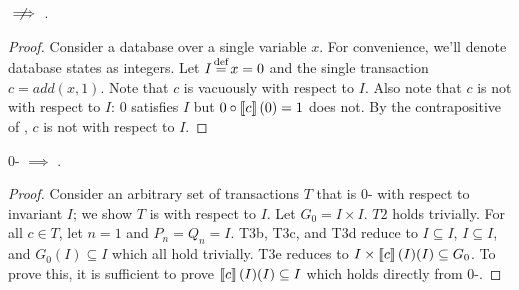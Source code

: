 \begin{claim}\label{clm:iconfluence-not-implies-istrengthstar}
  \iconfluence{} $\centernot\implies$ \istrengthstar{}.
\end{claim}
\begin{proof}
  Consider a database over a single variable $x$. For convenience, we'll denote
  database states as integers. Let $I \defeq x = 0$ and the single \imp{}
  transaction $c = add(x, 1)$. Note that $c$ is vacuously \iconfluent{} with
  respect to $I$. Also note that $c$ is not \ipreserving{} with respect to $I$:
  $0$ satisfies $I$ but $0 \circ \left\llbracket c\right\rrbracket(0) = 1$ does not. By the
  contrapositive of , $c$ is not
  \istrongstar{} with respect to $I$.
\end{proof}

\begin{claim}\label{clm:0-isafety-implies-istrength}
  0-\isafety{} $\implies$ \istrength{}.
\end{claim}
\begin{proof}
  Consider an arbitrary set of \imp{} transactions $T$ that is 0-\isafe{} with
  respect to invariant $I$; we show $T$ is \istrong{} with respect to $I$. Let
  $G_0 = I \times I$. $T2$ holds trivially. For all $c \in T$, let $n = 1$ and
  $P_n = Q_n = I$. T3b, T3c, and T3d reduce to $I \subseteq I$, $I \subseteq
  I$, and $G_0(I) \subseteq I$ which all hold trivially. T3e reduces to $I
  \times \left\llbracket c\right\rrbracket(I)(I) \subseteq G_0$. To prove this, it is sufficient to
  prove $\left\llbracket c\right\rrbracket(I)(I) \subseteq I$ which holds directly from 0-\isafety{}.
\end{proof}

